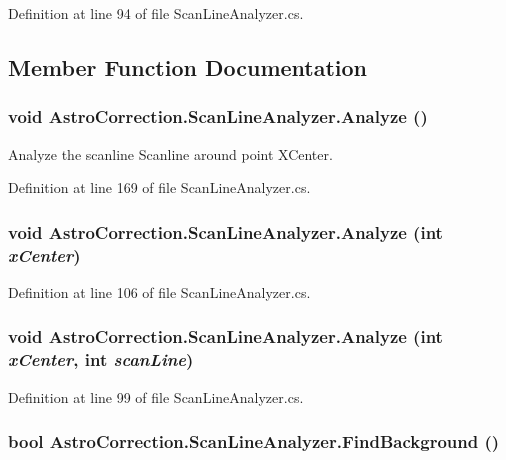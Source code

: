 Definition at line 94 of file ScanLineAnalyzer.cs.

\subsection{Member Function Documentation}
\subsubsection[{Analyze}]{\setlength{\rightskip}{0pt plus 5cm}void AstroCorrection.ScanLineAnalyzer.Analyze ()}\label{class_astro_correction_1_1_scan_line_analyzer_acb18e449588661b82dfbe7cc95d6788d}


Analyze the scanline Scanline around point XCenter. 

Definition at line 169 of file ScanLineAnalyzer.cs.
\subsubsection[{Analyze}]{\setlength{\rightskip}{0pt plus 5cm}void AstroCorrection.ScanLineAnalyzer.Analyze (int {\em xCenter})}\label{class_astro_correction_1_1_scan_line_analyzer_a18201fcb160d0c1ff25ed1e0a6ebcb7b}


Definition at line 106 of file ScanLineAnalyzer.cs.
\subsubsection[{Analyze}]{\setlength{\rightskip}{0pt plus 5cm}void AstroCorrection.ScanLineAnalyzer.Analyze (int {\em xCenter}, \/  int {\em scanLine})}\label{class_astro_correction_1_1_scan_line_analyzer_a18a0c0aa491c15ab2951b0ef2d5dfd50}


Definition at line 99 of file ScanLineAnalyzer.cs.
\subsubsection[{FindBackground}]{\setlength{\rightskip}{0pt plus 5cm}bool AstroCorrection.ScanLineAnalyzer.FindBackground ()}\label{class_astro_correction_1_1_scan_line_analyzer_a9c85404e448688e43d6acf3a3908475b}


